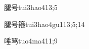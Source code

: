 \begin{verbete}{腿号}{tui3hao4}{13;5}
\end{verbete}

\begin{verbete}{腿号箍}{tui3hao4gu1}{13;5;14}
\end{verbete}

\begin{verbete}{唾骂}{tuo4ma4}{11;9}
\end{verbete}

